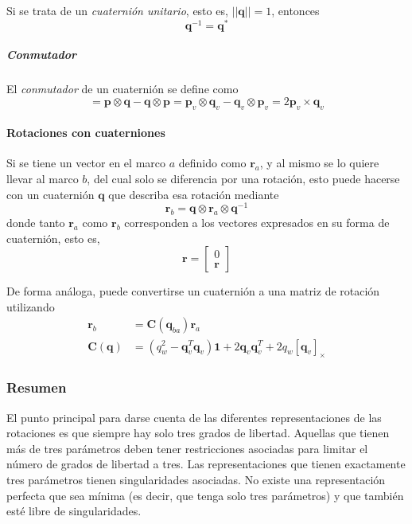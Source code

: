 Si se trata de un \textit{cuaternión unitario}, esto es, $||\bm{q}|| = 1$, entonces
\begin{equation}
    \bm{q}^{-1} = \bm{q}^*    
\end{equation}

\subparagraph{Conmutador}
El \textit{conmutador} de un cuaternión se define como
\begin{equation}
    [\bm{p},\bm{q}] = \bm{p}\otimes\bm{q} - \bm{q}\otimes\bm{p} = \bm{p}_v\otimes\bm{q}_v - \bm{q}_v\otimes\bm{p}_v = 2\bm{p}_v\times\bm{q}_v
    \label{eq:quaternioncommutator}
\end{equation}

\paragraph{Rotaciones con cuaterniones}
Si se tiene un vector en el marco $a$ definido como $\bm{r}_a$, y al mismo se lo quiere llevar al marco $b$, del cual solo se diferencia por una rotación, esto puede hacerse con un cuaternión $\bm{q}$ que describa esa rotación mediante
\begin{equation}
    \bm{r}_b = \bm{q}\otimes\bm{r}_a\otimes\bm{q}^{-1}
    \label{eq:quaternionvectorrotation}
\end{equation}
donde tanto $\bm{r}_a$ como $\bm{r}_b$ corresponden a los vectores expresados en su forma de cuaternión, esto es,
\begin{equation}
    \bm{r} = 
    \begin{bmatrix}
    0 \\
    \bm{r}
    \end{bmatrix}
    \label{eq:vectorquaternionform}
\end{equation}

De forma análoga, puede convertirse un cuaternión a una matriz de rotación utilizando
\begin{align}
    \bm{r}_b &= \bm{C}(\bm{q}_{ba})\bm{r}_a \\
    \bm{C}(\bm{q}) &= (q_w^2 - \bm{q}_v^T\bm{q}_v)\bm{1} + 2\bm{q}_v\bm{q}_v^T + 2q_w\left[\bm{q}_v\right]_\times
\end{align}

\subsubsection{Resumen}
El punto principal para darse cuenta de las diferentes representaciones de las rotaciones es que siempre hay solo tres grados de libertad. Aquellas que tienen más de tres parámetros deben tener restricciones asociadas para limitar el número de grados de libertad a tres. Las representaciones que tienen exactamente tres parámetros tienen singularidades asociadas. No existe una representación perfecta que sea mínima (es decir, que tenga solo tres parámetros) y que también esté libre de singularidades\cite{stuelpnagle1964}.%

